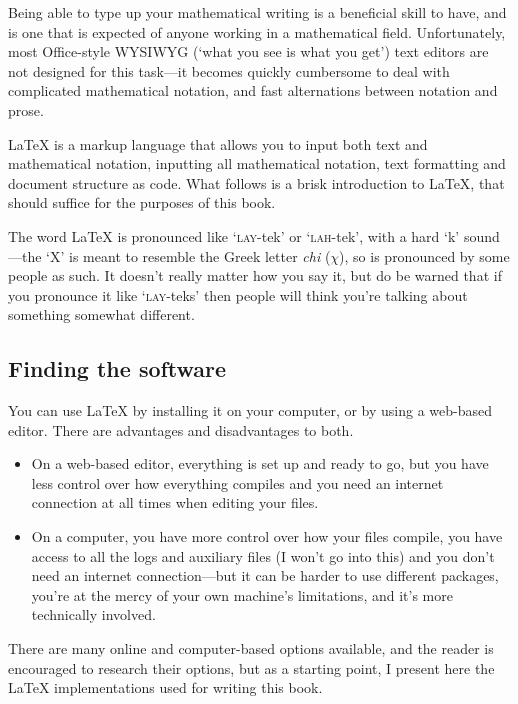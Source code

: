 Being able to type up your mathematical writing is a beneficial skill to have, and is one that is expected of anyone working in a mathematical field. Unfortunately, most Office-style {\small WYSIWYG} (`what you see is what you get') text editors are not designed for this task---it becomes quickly cumbersome to deal with complicated mathematical notation, and fast alternations between notation and prose.

\LaTeX{} is a markup language that allows you to input both text and mathematical notation, inputting all mathematical notation, text formatting and document structure as code. What follows is a brisk introduction to \LaTeX{}, that should suffice for the purposes of this book.

The word \LaTeX{} is pronounced like `\textsc{lay}-tek' or `\textsc{lah}-tek', with a hard `k' sound---the `X' is meant to resemble the Greek letter \textit{chi} ($\chi$), so is pronounced by some people as such. It doesn't really matter how you say it, but do be warned that if you pronounce it like `\textsc{lay}-teks' then people will think you're talking about something somewhat different.

\subsection*{Finding the software}

You can use \LaTeX{} by installing it on your computer, or by using a web-based editor. There are advantages and disadvantages to both.

\begin{itemize}
\item On a web-based editor, everything is set up and ready to go, but you have less control over how everything compiles and you need an internet connection at all times when editing your files.
\item On a computer, you have more control over how your files compile, you have access to all the logs and auxiliary files (I won't go into this) and you don't need an internet connection---but it can be harder to use different packages, you're at the mercy of your own machine's limitations, and it's more technically involved.
\end{itemize}

There are many online and computer-based options available, and the reader is encouraged to research their options, but as a starting point, I present here the \LaTeX{} implementations used for writing this book.

